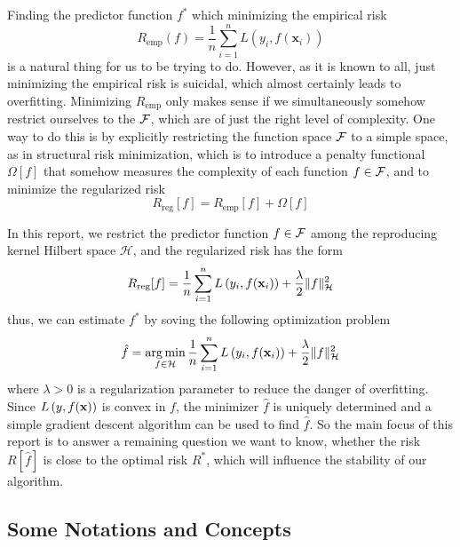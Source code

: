 Finding the predictor function \(f^{*}\) which minimizing the empirical risk
\begin{equation}
	R_{\text{emp}}(f)=\frac{1}{n}\sum_{i=1}^{n}L\left(y_{i},f(\textbf{x}_{i})\right)
\end{equation}
is a natural thing for us to be trying to do. However, as it is known to all, just minimizing the empirical risk is suicidal, which almost certainly leads to overfitting. Minimizing \(R_{\text{emp}}\) only makes sense if we simultaneously somehow restrict ourselves to the \(\mathcal{F}\), which are of just the right level of complexity. One way to do this is by explicitly restricting the function space \(\mathcal{F}\) to a simple space, as in structural risk minimization, which is to introduce a penalty functional \(\Omega[f]\) that somehow measures the complexity of each function \(f\in\mathcal{F}\), and to minimize the regularized risk
\begin{equation}
	R_{\text{reg}}[f]=R_{\text{emp}}[f]+\Omega[f]
\end{equation}

In this report, we restrict the predictor function \(f\in\mathcal{F}\) among the reproducing kernel Hilbert space \(\mathcal{H}\), and the regularized risk has the form
\begin{equation}
	\label{eq:regularized-risk-of-rkhs}
	R_{\text{reg}}[f]=\frac{1}{n}\sum_{i=1}^{n}L\left(y_{i},f(\mathbf{x}_{i})\right)+\frac{\lambda}{2}\|f\|_{\mathcal{H}}^{2}
\end{equation}
thus, we can estimate \(f^{*}\) by soving the following optimization problem
\begin{equation}
	\hat{f}=\underset{f\in\mathcal{H}}{\arg\min}\,\frac{1}{n}\sum_{i=1}^{n}L\left(y_{i},f(\mathbf{x}_{i})\right)+\frac{\lambda}{2}\|f\|_{\mathcal{H}}^{2}
\end{equation}
where \(\lambda>0\) is a regularization parameter to reduce the danger of overfitting. Since \(L\left(y,f(\mathbf{x})\right)\) is convex in \(f\), the minimizer \(\hat{f}\) is uniquely determined and a simple gradient descent algorithm can be used to find \(\hat{f}\). So the main focus of this report is to answer a remaining question we want to know, whether the risk \(R[\hat{f}]\) is close to the optimal risk \(R^{*}\), which will influence the stability of our algorithm.

\subsection{Some Notations and Concepts}

